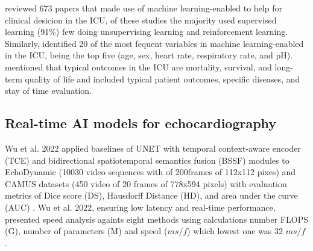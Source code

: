 \cite{hong2022} reviewed 673 papers that made use of machine learning-enabled to help for clinical desicion in the ICU, of these studies the majority used supervised learning (91\%) few doing unsupervising learning and reinforcement learning.
Similarly, \cite{hong2022} identified 20 of the most fequent variables in machine learning-enabled in the ICU, being the top five (age, sex, heart rate, respiratory rate, and pH).
\cite{hong2022} mentioned that typical outcomes in the ICU are mortality, survival, and long-term quality of life and included typical patient outcomes, specific diseases, and stay of time evaluation. 

\subsection{Real-time AI models for echocardiography}

Wu et al. 2022 applied baselines of UNET with temporal context-aware encoder (TCE) and bidirectional spatiotemporal semantics fusion (BSSF) modules to EchoDynamic (10030 video sequences with of 200frames of 112x112 pixes) and CAMUS datasets  (450 video of 20 frames of 778x594 pixels) with evaluation metrics of Dice score (DS), Hausdorff Distance (HD), and area under the curve (AUC) \cite{wu20222}.
Wu et al. 2022, ensuring low latency and real-time performance, presented speed analysis againts eight methods using calculations number FLOPS (G), number of parameters (M) and speed ($ms/f$) which lowest one was 32 $ms/f$  \cite{wu20222}.

